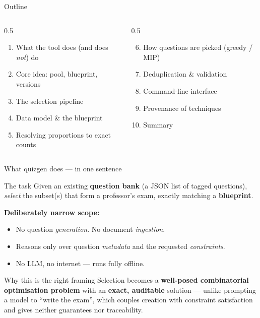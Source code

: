 \documentclass[11pt,aspectratio=169]{beamer}
\begin{document}
\begin{frame}{Outline}
  \begin{columns}[T]
    \begin{column}{0.5\textwidth}
      \begin{enumerate}
        \item What the tool does (and does \emph{not}) do
        \item Core idea: pool, blueprint, versions
        \item The selection pipeline
        \item Data model \& the blueprint
        \item Resolving proportions to exact counts
      \end{enumerate}
    \end{column}
    \begin{column}{0.5\textwidth}
      \begin{enumerate}
        \setcounter{enumi}{5}
        \item How questions are picked (greedy / MIP)
        \item Deduplication \& validation
        \item Command-line interface
        \item Provenance of techniques
        \item Summary
      \end{enumerate}
    \end{column}
  \end{columns}
\end{frame}

\begin{frame}{What quizgen does — in one sentence}
  \begin{block}{The task}
    Given an existing \textbf{question bank} (a JSON list of tagged questions),
    \emph{select} the subset(s) that form a professor's exam, exactly matching a
    \textbf{blueprint}.
  \end{block}

  \vspace{2mm}
  \textbf{Deliberately narrow scope:}
  \begin{itemize}
    \item No question \emph{generation}. \quad No document \emph{ingestion}.
    \item Reasons only over question \emph{metadata} and the requested \emph{constraints}.
    \item \alert{No LLM, no internet} — runs fully offline.
  \end{itemize}

  \vspace{2mm}
  \begin{block}{Why this is the right framing}
    Selection becomes a \textbf{well-posed combinatorial optimisation problem}
    with an \textbf{exact, auditable} solution — unlike prompting a model to
    ``write the exam'', which couples creation with constraint satisfaction and
    gives neither guarantees nor traceability.
  \end{block}
\end{frame}
\end{document}
